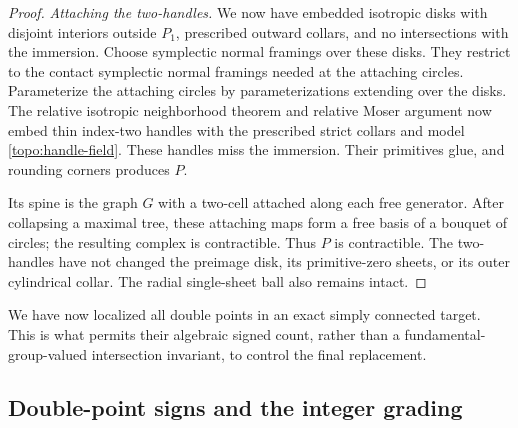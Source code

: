\begin{proof}
\emph{Attaching the two-handles.}
We now have embedded isotropic disks with disjoint interiors outside
$P_1$, prescribed outward collars, and no intersections with the
immersion.  Choose symplectic normal framings over these disks.  They
restrict to the contact symplectic normal framings needed at the attaching
circles.  Parameterize the attaching circles by parameterizations
extending over the disks.  The relative isotropic neighborhood
theorem and relative Moser argument now embed thin index-two
handles with the prescribed strict collars and model
\eqref{topo:handle-field}.  These handles miss the immersion.
Their primitives glue, and rounding corners produces $P$.

Its spine is the graph $G$ with a two-cell attached along each
free generator.  After collapsing a maximal tree, these attaching
maps form a free basis of a bouquet of circles; the resulting
complex is contractible.  Thus $P$ is contractible.  The two-handles
have not changed the preimage disk, its primitive-zero sheets,
or its outer cylindrical collar.  The radial single-sheet ball
also remains intact.
\end{proof}

We have now localized all double points in an exact simply connected
target.  This is what permits their algebraic signed count, rather
than a fundamental-group-valued intersection invariant, to control
the final replacement.

\subsection{Double-point signs and the integer grading}

